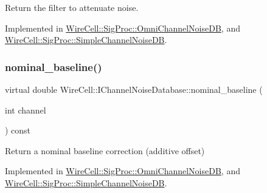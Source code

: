 Return the filter to attenuate noise. 



Implemented in \hyperlink{class_wire_cell_1_1_sig_proc_1_1_omni_channel_noise_d_b_a125b09b4d7d5cb973ae418936343bf4a}{Wire\+Cell\+::\+Sig\+Proc\+::\+Omni\+Channel\+Noise\+DB}, and \hyperlink{class_wire_cell_1_1_sig_proc_1_1_simple_channel_noise_d_b_ab0b17e111bc6617ac4702610b262ed2f}{Wire\+Cell\+::\+Sig\+Proc\+::\+Simple\+Channel\+Noise\+DB}.

\mbox{\label{class_wire_cell_1_1_i_channel_noise_database_a253f602c70bddb7986e63dc14b8d8e6e}} 
\subsubsection{\texorpdfstring{nominal\+\_\+baseline()}{nominal\_baseline()}}
{\footnotesize\ttfamily virtual double Wire\+Cell\+::\+I\+Channel\+Noise\+Database\+::nominal\+\_\+baseline (\begin{DoxyParamCaption}\item[{int}]{channel }\end{DoxyParamCaption}) const\hspace{0.3cm}{\ttfamily [pure virtual]}}



Return a nominal baseline correction (additive offset) 



Implemented in \hyperlink{class_wire_cell_1_1_sig_proc_1_1_omni_channel_noise_d_b_a7d762e341143dea15eb2d8f57aac9c86}{Wire\+Cell\+::\+Sig\+Proc\+::\+Omni\+Channel\+Noise\+DB}, and \hyperlink{class_wire_cell_1_1_sig_proc_1_1_simple_channel_noise_d_b_ae5b0390412d61c8fab8514ddd8358fa1}{Wire\+Cell\+::\+Sig\+Proc\+::\+Simple\+Channel\+Noise\+DB}.

\mbox{\label{class_wire_cell_1_1_i_channel_noise_database_a4d772c3ba5f7071a2d869264f37dfecc}} 
